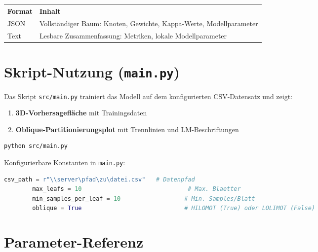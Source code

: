 \documentclass[11pt,a4paper]{report}
\begin{document}
	\begin{center}
		\begin{tabular}{ll}
			\toprule
			\textbf{Format} & \textbf{Inhalt} \\
			\midrule
			JSON & Vollständiger Baum: Knoten, Gewichte, Kappa-Werte, Modellparameter \\
			Text & Lesbare Zusammenfassung: Metriken, lokale Modellparameter \\
			\bottomrule
		\end{tabular}
	\end{center}
	
	\section{Skript-Nutzung (\texttt{main.py})}
	
	Das Skript \texttt{src/main.py} trainiert das Modell auf dem konfigurierten CSV-Datensatz und zeigt:
	\begin{enumerate}
		\item \textbf{3D-Vorhersagefläche} mit Trainingsdaten
		\item \textbf{Oblique-Partitionierungsplot} mit Trennlinien und LM-Beschriftungen
	\end{enumerate}
	
	\begin{lstlisting}[language=bash]
		python src/main.py
	\end{lstlisting}
	
	Konfigurierbare Konstanten in \texttt{main.py}:
	
	\begin{lstlisting}[language=python,caption={Konfiguration in main.py}]
		csv_path = r"\\server\pfad\zu\datei.csv"   # Datenpfad
		max_leafs = 10                              # Max. Blaetter
		min_samples_per_leaf = 10                  # Min. Samples/Blatt
		oblique = True                             # HILOMOT (True) oder LOLIMOT (False)
	\end{lstlisting}
	
	\section{Parameter-Referenz}
	
\end{document}
